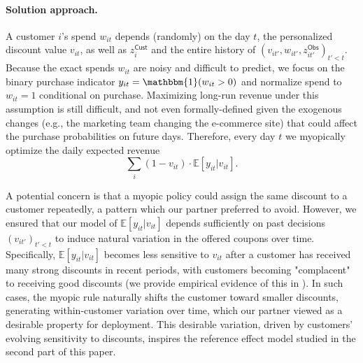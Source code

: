 \documentclass[format=acmsmall, review=false]{acmart}
\newcommand{\bI}{\mathbbm{1}}
\newcommand{\bE}{\mathbb{E}}
\newcommand{\zCust}{z^\mathsf{Cust}}
\newcommand{\zObs}{z^\mathsf{Obs}}
\begin{document}
\paragraph{Solution approach.}
A customer $i$'s spend $w_{it}$ depends (randomly) on the day $t$, the personalized discount value $v_{it}$, as well as $\zCust_i$ and the entire history of $(v_{it'},w_{it'},\zObs_{it'})_{t'<t}$.
Because the exact spends $w_{it}$ are noisy and difficult to predict, we focus on the binary purchase indicator $y_{it}=\bI(w_{it}>0)$ and normalize spend to $w_{it} = 1$ conditional on purchase.
Maximizing long-run revenue under this assumption is still difficult, and not even formally-defined given the exogenous changes (e.g., the marketing team changing the e-commerce site) that could affect the purchase probabilities on future days.
Therefore, every day $t$ we myopically optimize the daily expected revenue
$$\sum_i(1-v_{it})\cdot\bE[y_{it}|v_{it}].$$ 

A potential concern is that a myopic policy could assign the same discount to a customer repeatedly, a pattern which our partner preferred to avoid.
However, we ensured that our model of $\bE[y_{it}|v_{it}]$ depends sufficiently on past decisions $(v_{it'})_{t'<t}$ to induce natural variation in the offered coupons over time.
Specifically, $\bE[y_{it}|v_{it}]$ becomes less sensitive to $v_{it}$ after a customer has received many strong discounts in recent periods, with customers becoming "complacent" to receiving good discounts (we provide empirical evidence of this in \textbf{}).
In such cases, the myopic rule naturally shifts the customer toward smaller discounts, generating within-customer variation over time, which our partner viewed as a desirable property for deployment.
This desirable variation, driven by customers’ evolving sensitivity to discounts, inspires the reference effect model studied in the second part of this paper.
\end{document}
